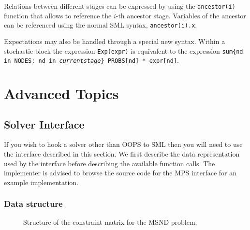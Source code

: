 \documentclass[10pt,a4paper]{report}
\begin{document}
Relations between different stages can be expressed by using the 
{\tt ancestor(i)} function that allows to reference the $i$-th ancestor
stage. Variables of the ancestor can be referenced using the normal SML syntax,
{\tt ancestor(i).x}.

Expectations may also be handled through a special new syntax. Within a
stochastic block the expression {\tt Exp(expr)} is equivalent to the expression
{\tt sum\{nd in NODES: nd in \textit{currentstage}\} PROBS[nd] * expr[nd]}.

\chapter{Advanced Topics}

\section{Solver Interface}
\label{interface}

If you wish to hook a solver other than OOPS to SML then you will need to use
the interface described in this section. We first describe the data
representation used by the interface before describing the available function
calls. The implementer is advised to browse the source code for the MPS
interface for an example implementation.

\subsection{Data structure}
\begin{figure}
   \caption{ \label{Iface eg}
      Structure of the constraint matrix for the MSND problem.
   }
   \begin{center}
   \end{center}
\end{figure}
\end{document}
